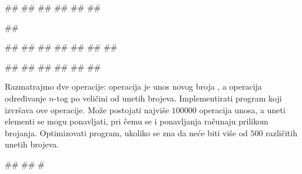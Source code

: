 \begin{Exercise}[label=3_25]
\begin{minitest}
\begin{test}{2}
#\naslovIzlaz#
##
##
##
##
##
\end{test}
\end{minitest}
\begin{minitest}
\begin{test}{3}
##
  
##
##
##
##
##
##
##

#\naslovIzlaz#
##
##
##
##
##
\end{test}
\end{minitest}

\end{Exercise}

\begin{Answer}[ref=3_25]
\end{Answer}
\begin{Exercise}[difficulty=1, label=3_26]
  Razmatrajmo dve operacije: operacija  je unos novog broja
  , a operacija  određivanje $n$-tog po veličini od
  unetih brojeva. Implementirati program koji izvršava ove
  operacije. Može postojati najviše $100000$ operacija unosa, a uneti
  elementi se mogu ponavljati, pri čemu se i ponavljanja računaju
  prilikom brojanja. Optimizovati program, ukoliko se zna da neće biti
  više od $500$ različitih unetih brojeva. 
  
\begin{maxitest}
\begin{upotreba}{1}
#\naslovInt#
##
#
\end{upotreba}
\end{maxitest}
  
\end{Exercise}

